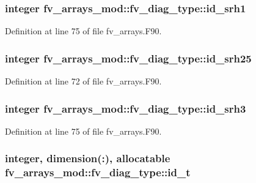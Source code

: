 \subsubsection[{id\-\_\-srh1}]{\setlength{\rightskip}{0pt plus 5cm}integer fv\-\_\-arrays\-\_\-mod\-::fv\-\_\-diag\-\_\-type\-::id\-\_\-srh1}\label{structfv__arrays__mod_1_1fv__diag__type_a75906819114afc7fc5718b5a788bafc3}


Definition at line 75 of file fv\-\_\-arrays.\-F90.

\subsubsection[{id\-\_\-srh25}]{\setlength{\rightskip}{0pt plus 5cm}integer fv\-\_\-arrays\-\_\-mod\-::fv\-\_\-diag\-\_\-type\-::id\-\_\-srh25}\label{structfv__arrays__mod_1_1fv__diag__type_ada7359b37acc18c14a89fad469c630bc}


Definition at line 72 of file fv\-\_\-arrays.\-F90.

\subsubsection[{id\-\_\-srh3}]{\setlength{\rightskip}{0pt plus 5cm}integer fv\-\_\-arrays\-\_\-mod\-::fv\-\_\-diag\-\_\-type\-::id\-\_\-srh3}\label{structfv__arrays__mod_1_1fv__diag__type_a31e4e8d5c3aadfef8632e751ffc6d8d8}


Definition at line 75 of file fv\-\_\-arrays.\-F90.

\subsubsection[{id\-\_\-t}]{\setlength{\rightskip}{0pt plus 5cm}integer, dimension(\-:), allocatable fv\-\_\-arrays\-\_\-mod\-::fv\-\_\-diag\-\_\-type\-::id\-\_\-t}\label{structfv__arrays__mod_1_1fv__diag__type_a1ff1bb7f29693c8bf383533a4283b1db}


